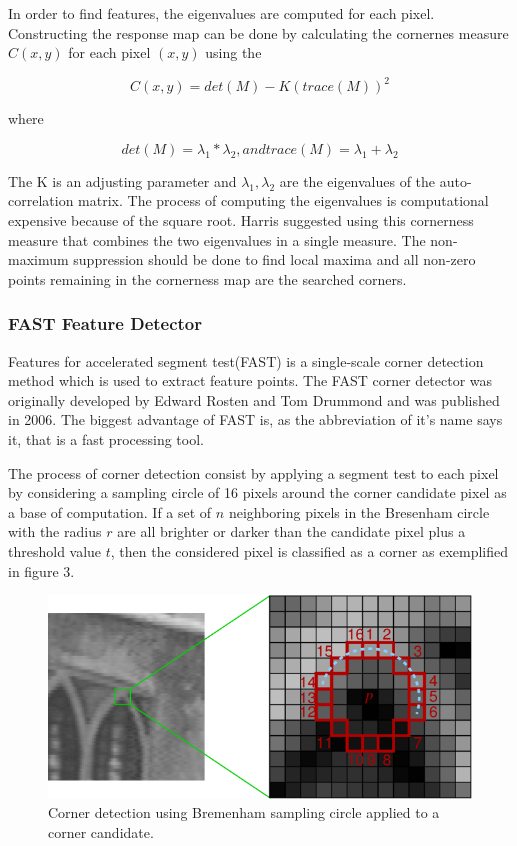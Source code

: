 \documentclass[9pt,shortpaper,twoside,web]{ieeecolor}
\begin{document}
In order to find features, the eigenvalues are computed for each pixel. Constructing the response map can be done by calculating the cornernes measure $C(x, y)$ for each pixel $(x,y)$ using the

\begin{equation}
\label{eq4}
C(x, y) = det(M) - K(trace(M))^2
\end{equation}

where 


\begin{equation}
\label{eq5}
det(M) = \lambda_1 * \lambda_2, and trace(M) = \lambda_1 + \lambda_2
\end{equation}

The K is an adjusting parameter and $\lambda_1, \lambda_2$ are the eigenvalues of the auto-correlation matrix. The process of computing the eigenvalues is computational expensive because of the square root. Harris suggested using this cornerness measure that combines the two eigenvalues in a single measure. The non-maximum suppression should be done to find local maxima and all non-zero points remaining in the cornerness map are the searched corners.
\\

\subsubsection{FAST Feature Detector}

Features for accelerated segment test(FAST) is a  single-scale corner detection method which is used to extract feature points. The FAST corner detector was originally developed by Edward Rosten and Tom Drummond and was published in 2006. The biggest advantage of FAST is, as the abbreviation of it's name says it, that is a fast processing tool.

The process of corner detection consist by applying a segment test to each pixel by considering a sampling circle of 16 pixels around the corner candidate pixel as a base of computation. If a set of $n$ neighboring pixels in the Bresenham circle with the radius $r$ are all brighter or darker than the candidate pixel plus a threshold value $t$, then the considered pixel is classified as a corner as exemplified in figure 3.

\begin{figure}[htb]
\includegraphics[width=\columnwidth]{res/fig/FAST.png}
\caption{Corner detection using Bremenham sampling circle applied to a corner candidate.}
\label{fig3}
\end{figure}
\end{document}
